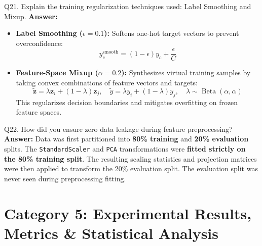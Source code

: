 \documentclass[a4paper, 11pt]{article}
\begin{document}
\begin{questionbox}{Q21. Explain the training regularization techniques used: Label Smoothing and Mixup.}
\textbf{Answer:}
\begin{itemize}
    \item \textbf{Label Smoothing ($\epsilon = 0.1$):} Softens one-hot target vectors to prevent overconfidence:
    \[
    y_c^{\text{smooth}} = (1 - \epsilon)y_c + \frac{\epsilon}{C}
    \]
    \item \textbf{Feature-Space Mixup ($\alpha = 0.2$):} Synthesizes virtual training samples by taking convex combinations of feature vectors and targets:
    \[
    \tilde{\mathbf{z}} = \lambda \mathbf{z}_i + (1 - \lambda)\mathbf{z}_j, \quad \tilde{y} = \lambda y_i + (1 - \lambda)y_j, \quad \lambda \sim \operatorname{Beta}(\alpha, \alpha)
    \]
    This regularizes decision boundaries and mitigates overfitting on frozen feature spaces.
\end{itemize}
\end{questionbox}

\begin{questionbox}{Q22. How did you ensure zero data leakage during feature preprocessing?}
\textbf{Answer:}
Data was first partitioned into \textbf{80\% training} and \textbf{20\% evaluation} splits. The \texttt{StandardScaler} and \texttt{PCA} transformations were \textbf{fitted strictly on the 80\% training split}. The resulting scaling statistics and projection matrices were then applied to transform the 20\% evaluation split. The evaluation split was never seen during preprocessing fitting.
\end{questionbox}

\newpage
\section{Category 5: Experimental Results, Metrics \& Statistical Analysis}
\end{document}
